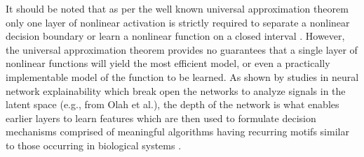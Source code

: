 It should be noted that as per the well known universal approximation theorem only one layer of nonlinear activation is strictly required to separate a nonlinear decision boundary or learn a nonlinear function on a closed interval \cite{cybenko_approximation_1989}.  However, the universal approximation theorem provides no guarantees that a single layer of nonlinear functions will yield the most efficient model, or even a practically implementable model of the function to be learned.  As shown by studies in neural network explainability which break open the networks to analyze signals in the latent space (e.g., from Olah et al.), the depth of the network is what enables earlier layers to learn features which are then used to formulate decision mechanisms comprised of meaningful algorithms having recurring motifs similar to those occurring in biological systems \cite{olah2020zoom,olah2017feature}.


